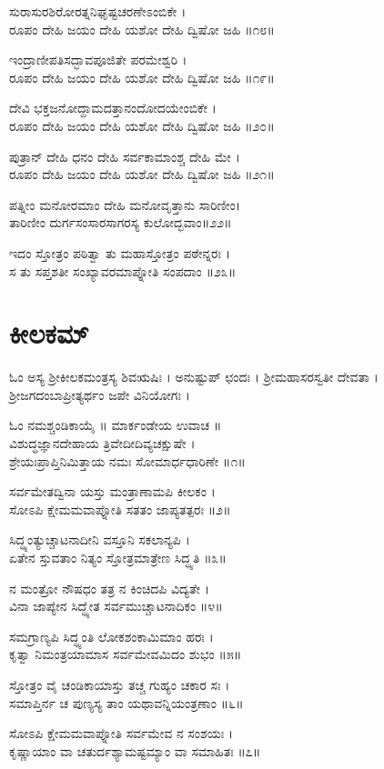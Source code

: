 ಸುರಾಸುರಶಿರೋರತ್ನನಿಘೃಷ್ಟಚರಣೇಽಂಬಿಕೇ ।\\
ರೂಪಂ ದೇಹಿ ಜಯಂ ದೇಹಿ ಯಶೋ ದೇಹಿ ದ್ವಿಷೋ ಜಹಿ ॥೧೮॥

ಇಂದ್ರಾಣೀಪತಿಸದ್ಭಾವಪೂಜಿತೇ ಪರಮೇಶ್ವರಿ ।\\
ರೂಪಂ ದೇಹಿ ಜಯಂ ದೇಹಿ ಯಶೋ ದೇಹಿ ದ್ವಿಷೋ ಜಹಿ ॥೧೯॥

ದೇವಿ ಭಕ್ತಜನೋದ್ದಾಮದತ್ತಾನಂದೋದಯೇಂಬಿಕೇ ।\\
ರೂಪಂ ದೇಹಿ ಜಯಂ ದೇಹಿ ಯಶೋ ದೇಹಿ ದ್ವಿಷೋ ಜಹಿ ॥೨೦॥

ಪುತ್ರಾನ್ ದೇಹಿ ಧನಂ ದೇಹಿ ಸರ್ವಕಾಮಾಂಶ್ಚ ದೇಹಿ ಮೇ ।\\
ರೂಪಂ ದೇಹಿ ಜಯಂ ದೇಹಿ ಯಶೋ ದೇಹಿ ದ್ವಿಷೋ ಜಹಿ ॥೨೧॥

ಪತ್ನೀಂ ಮನೋರಮಾಂ ದೇಹಿ ಮನೋವೃತ್ತಾನು ಸಾರಿಣೀಂ।\\
ತಾರಿಣೀಂ ದುರ್ಗಸಂಸಾರಸಾಗರಸ್ಯ ಕುಲೋದ್ಭವಾಂ॥೨೨॥

ಇದಂ ಸ್ತೋತ್ರಂ ಪಠಿತ್ವಾ ತು ಮಹಾಸ್ತೋತ್ರಂ ಪಠೇನ್ನರಃ ।\\
ಸ ತು ಸಪ್ತಶತೀ ಸಂಖ್ಯಾವರಮಾಪ್ನೋತಿ ಸಂಪದಾಂ ॥೨೩॥
\section{ಕೀಲಕಮ್}
ಓಂ ಅಸ್ಯ ಶ್ರೀಕೀಲಕಮಂತ್ರಸ್ಯ ಶಿವಋಷಿಃ । ಅನುಷ್ಟುಪ್ ಛಂದಃ । ಶ್ರೀಮಹಾಸರಸ್ವತೀ ದೇವತಾ । ಶ್ರೀಜಗದಂಬಾಪ್ರೀತ್ಯರ್ಥಂ ಜಪೇ ವಿನಿಯೋಗಃ ।

ಓಂ ನಮಶ್ಚಂಡಿಕಾಯೈ ॥ ಮಾರ್ಕಂಡೇಯ ಉವಾಚ ॥\\
ವಿಶುದ್ಧಜ್ಞಾನದೇಹಾಯ ತ್ರಿವೇದೀದಿವ್ಯಚಕ್ಷುಷೇ ।\\
ಶ್ರೇಯಃಪ್ರಾಪ್ತಿನಿಮಿತ್ತಾಯ ನಮಃ ಸೋಮಾರ್ಧಧಾರಿಣೇ ॥೧॥

ಸರ್ವಮೇತದ್ವಿನಾ ಯಸ್ತು ಮಂತ್ರಾಣಾಮಪಿ ಕೀಲಕಂ ।\\
ಸೋಽಪಿ ಕ್ಷೇಮಮವಾಪ್ನೋತಿ ಸತತಂ ಜಾಪ್ಯತತ್ಪರಃ ॥೨॥

ಸಿದ್ಧ್ಯಂತ್ಯುಚ್ಚಾಟನಾದೀನಿ ವಸ್ತೂನಿ ಸಕಲಾನ್ಯಪಿ ।\\
ಏತೇನ ಸ್ತುವತಾಂ ನಿತ್ಯಂ ಸ್ತೋತ್ರಮಾತ್ರೇಣ ಸಿದ್ಧ್ಯತಿ ॥೩॥

ನ ಮಂತ್ರೋ ನೌಷಧಂ ತತ್ರ ನ ಕಿಂಚಿದಪಿ ವಿದ್ಯತೇ ।\\
ವಿನಾ ಜಾಪ್ಯೇನ ಸಿದ್ಧ್ಯೇತ ಸರ್ವಮುಚ್ಚಾಟನಾದಿಕಂ ॥೪॥

ಸಮಗ್ರಾಣ್ಯಪಿ ಸಿದ್ಧ್ಯಂತಿ ಲೋಕಶಂಕಾಮಿಮಾಂ ಹರಃ ।\\
ಕೃತ್ವಾ ನಿಮಂತ್ರಯಾಮಾಸ ಸರ್ವಮೇವಮಿದಂ ಶುಭಂ ॥೫॥

ಸ್ತೋತ್ರಂ ವೈ ಚಂಡಿಕಾಯಾಸ್ತು ತಚ್ಚ ಗುಹ್ಯಂ ಚಕಾರ ಸಃ ।\\
ಸಮಾಪ್ತಿರ್ನ ಚ ಪುಣ್ಯಸ್ಯ ತಾಂ ಯಥಾವನ್ನಿಯಂತ್ರಣಾಂ ॥೬॥

ಸೋಽಪಿ ಕ್ಷೇಮಮವಾಪ್ನೋತಿ ಸರ್ವಮೇವ ನ ಸಂಶಯಃ ।\\
ಕೃಷ್ಣಾಯಾಂ ವಾ ಚತುರ್ದಶ್ಯಾಮಷ್ಟಮ್ಯಾಂ ವಾ ಸಮಾಹಿತಃ ॥೭॥

